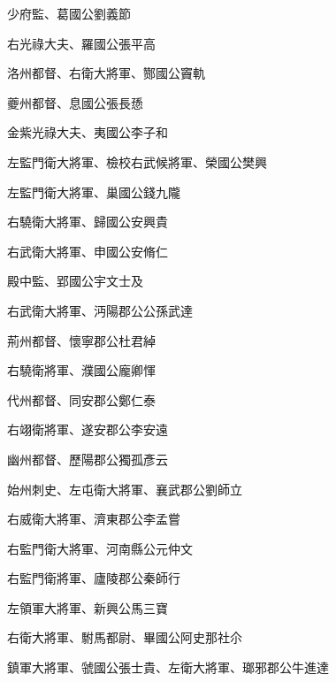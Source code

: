 \begin{pinyinscope}
 少府監、葛國公劉義節



 右光祿大夫、羅國公張平高



 洛州都督、右衛大將軍、酂國公竇軌



 夔州都督、息國公張長愻



 金紫光祿大夫、夷國公李子和



 左監門衛大將軍、檢校右武候將軍、榮國公樊興



 左監門衛大將軍、巢國公錢九隴



 右驍衛大將軍、歸國公安興貴



 右武衛大將軍、申國公安脩仁



 殿中監、郢國公宇文士及



 右武衛大將軍、沔陽郡公公孫武達



 荊州都督、懷寧郡公杜君綽



 右驍衛將軍、濮國公龐卿惲



 代州都督、同安郡公鄭仁泰



 右翊衛將軍、遂安郡公李安遠



 幽州都督、歷陽郡公獨孤彥云



 始州刺史、左屯衛大將軍、襄武郡公劉師立



 右威衛大將軍、濟東郡公李孟嘗



 右監門衛大將軍、河南縣公元仲文



 右監門衛將軍、廬陵郡公秦師行



 左領軍大將軍、新興公馬三寶



 右衛大將軍、駙馬都尉、畢國公阿史那社尒



 鎮軍大將軍、虢國公張士貴、左衛大將軍、瑯邪郡公牛進達




\end{pinyinscope}
